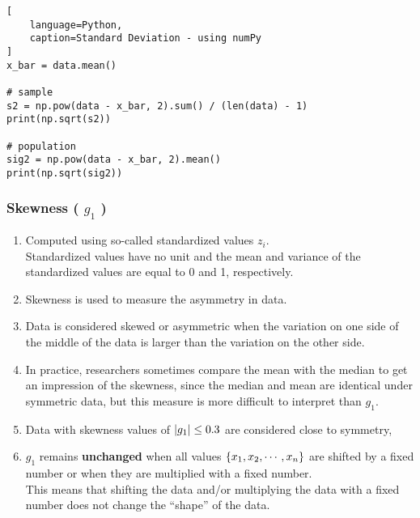 \begin{lstlisting}[
    language=Python, 
    caption=Standard Deviation - using numPy
]
x_bar = data.mean()

# sample
s2 = np.pow(data - x_bar, 2).sum() / (len(data) - 1)
print(np.sqrt(s2))

# population
sig2 = np.pow(data - x_bar, 2).mean() 
print(np.sqrt(sig2))
\end{lstlisting}


\subsubsection{Skewness ( $g_1$ ) \cite{statistics/book/Statistics-for-Data-Scientists/Maurits-Kaptein}} \label{Data/Describing Data/Central Tendency/Skewness}

\begin{enumerate}
    \item Computed using so-called standardized values $z_i$. \hfill \cite{statistics/book/Statistics-for-Data-Scientists/Maurits-Kaptein} \\
    Standardized values have no unit and the mean and variance of the standardized values are equal to 0 and 1, respectively. \hfill \cite{statistics/book/Statistics-for-Data-Scientists/Maurits-Kaptein}

    \item Skewness is used to measure the asymmetry in data. \hfill \cite{statistics/book/Statistics-for-Data-Scientists/Maurits-Kaptein}

    \item Data is considered skewed or asymmetric when the variation on one side of the middle of the data is larger than the variation on the other side. \hfill \cite{statistics/book/Statistics-for-Data-Scientists/Maurits-Kaptein}

    \item In practice, researchers sometimes compare the mean with the median to get an impression of the skewness, since the median and mean are identical under symmetric data, but this measure is more difficult to interpret than $g_1$. \hfill \cite{statistics/book/Statistics-for-Data-Scientists/Maurits-Kaptein}
    
    \item Data with skewness values of $\left| g_1 \right| \leq 0.3$ are considered close to symmetry, \hfill \cite{statistics/book/Statistics-for-Data-Scientists/Maurits-Kaptein}

    \item $g_1$ remains \textbf{unchanged} when all values $\left\{x_1, x_2, \cdots, x_n\right\}$ are shifted by a fixed number or when they are multiplied with a fixed number. \hfill \cite{statistics/book/Statistics-for-Data-Scientists/Maurits-Kaptein} \\
    This means that shifting the data and/or multiplying the data with a fixed number does not change the “shape” of the data. \hfill \cite{statistics/book/Statistics-for-Data-Scientists/Maurits-Kaptein}
\end{enumerate}


